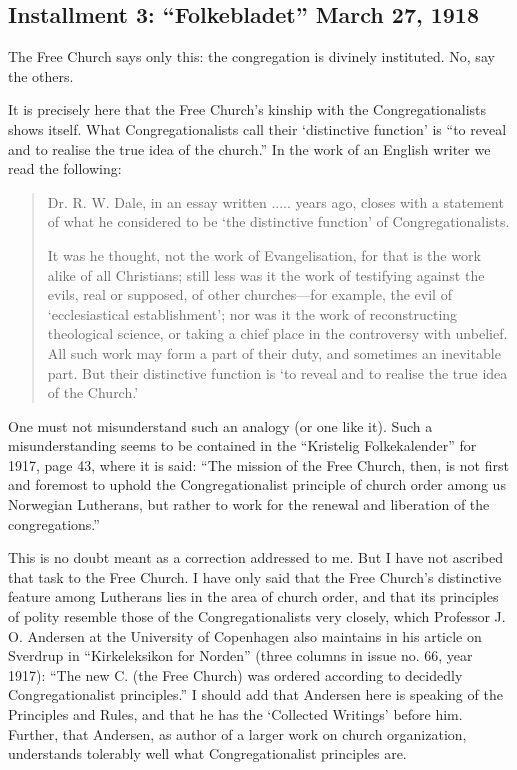 

\subsection{Installment 3: “Folkebladet” March 27, 1918}




The Free Church says only this: the congregation is divinely instituted. No, say the others.

It is precisely here that the Free Church’s kinship with the Congregationalists shows itself. What Congregationalists call their ‘distinctive function’ is “to reveal and to realise the true idea of the church.” In the work of an English writer we read the following:

\begin{quote}
Dr. R. W. Dale, in an essay written ..... years ago, closes with a statement of what he considered to be ‘the distinctive function’ of Congregationalists.

It was he thought, not the work of Evangelisation, for that is the work alike of all Christians; still less was it the work of testifying against the evils, real or supposed, of other churches—for example, the evil of ‘ecclesiastical establishment’; nor was it the work of reconstructing theological science, or taking a chief place in the controversy with unbelief. All such work may form a part of their duty, and sometimes an inevitable part. But their distinctive function is ‘to reveal and to realise the true idea of the Church.’
\end{quote}

One must not misunderstand such an analogy (or one like it). Such a misunderstanding seems to be contained in the “Kristelig Folkekalender” for 1917, page 43, where it is said: “The mission of the Free Church, then, is not first and foremost to uphold the Congregationalist principle of church order among us Norwegian Lutherans, but rather to work for the renewal and liberation of the congregations.”

This is no doubt meant as a correction addressed to me. But I have not ascribed that task to the Free Church. I have only said that the Free Church’s distinctive feature among Lutherans lies in the area of church order, and that its principles of polity resemble those of the Congregationalists very closely, which Professor J. O. Andersen at the University of Copenhagen also maintains in his article on Sverdrup in “Kirkeleksikon for Norden” (three columns in issue no. 66, year 1917): “The new C. (the Free Church) was ordered according to decidedly Congregationalist principles.” I should add that Andersen here is speaking of the Principles and Rules, and that he has the ‘Collected Writings’ before him. Further, that Andersen, as author of a larger work on church organization, understands tolerably well what Congregationalist principles are.

